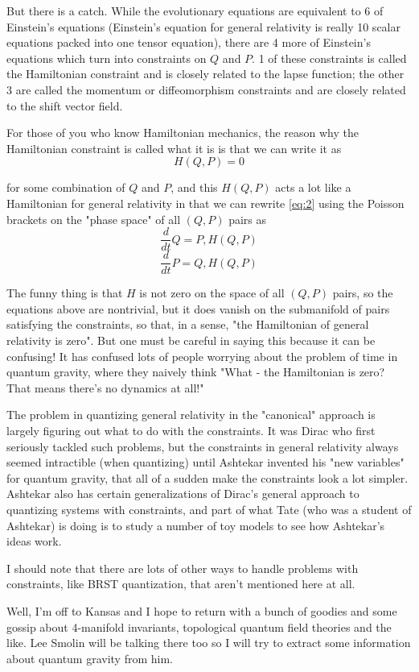 But there is a catch. While the evolutionary equations are equivalent to 6 of Einstein's equations (Einstein's equation for general relativity is really 10 scalar equations packed into one tensor equation), there are 4 more of Einstein's equations which turn into constraints on $Q$ and $P$. 1 of these constraints is called the Hamiltonian constraint and is closely related to the lapse function; the other 3 are called the momentum or diffeomorphism constraints and are closely related to the shift vector field.

For those of you who know Hamiltonian mechanics, the reason why the Hamiltonian constraint is called what it is is that we can write it as
\[H(Q,P) = 0\]

for some combination of $Q$ and $P$, and this $H(Q,P)$ acts a lot like a Hamiltonian for general relativity in that we can rewrite \ref{eq:2} using the Poisson brackets on the "phase space" of all $(Q,P)$ pairs as
\[\frac{d}{dt}Q = {P,H(Q,P)}\]
\[\frac{d}{dt}P = {Q,H(Q,P)}\]

The funny thing is that $H$ is not zero on the space of all $(Q,P)$ pairs, so the equations above are nontrivial, but it does vanish on the submanifold of pairs satisfying the constraints, so that, in a sense, "the Hamiltonian of general relativity is zero". But one must be careful in saying this because it can be confusing! It has confused lots of people worrying about the problem of time in quantum gravity, where they naively think "What - the Hamiltonian is zero? That means there's no dynamics at all!"

The problem in quantizing general relativity in the "canonical" approach is largely figuring out what to do with the constraints. It was Dirac who first seriously tackled such problems, but the constraints in general relativity always seemed intractible (when quantizing) until Ashtekar invented his "new variables" for quantum gravity, that all of a sudden make the constraints look a lot simpler. Ashtekar also has certain generalizations of Dirac's general approach to quantizing systems with constraints, and part of what Tate (who was a student of Ashtekar) is doing is to study a number of toy models to see how Ashtekar's ideas work.

I should note that there are lots of other ways to handle problems with constraints, like BRST quantization, that aren't mentioned here at all.

Well, I'm off to Kansas and I hope to return with a bunch of goodies and some gossip about 4-manifold invariants, topological quantum field theories and the like. Lee Smolin will be talking there too so I will try to extract some information about quantum gravity from him. 


